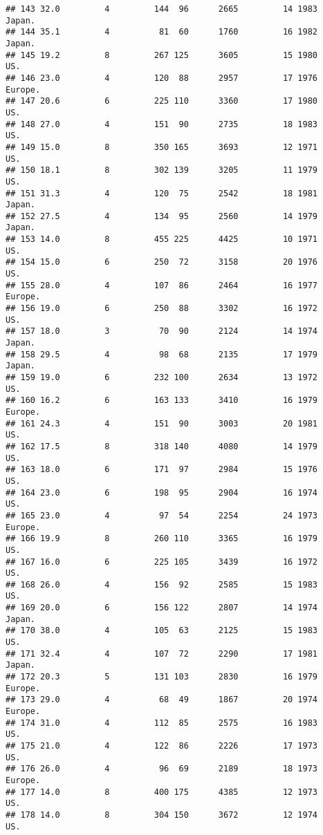 \documentclass[11pt,]{article}
\begin{document}
\begin{verbatim}
## 143 32.0         4         144  96      2665         14 1983   Japan.
## 144 35.1         4          81  60      1760         16 1982   Japan.
## 145 19.2         8         267 125      3605         15 1980      US.
## 146 23.0         4         120  88      2957         17 1976  Europe.
## 147 20.6         6         225 110      3360         17 1980      US.
## 148 27.0         4         151  90      2735         18 1983      US.
## 149 15.0         8         350 165      3693         12 1971      US.
## 150 18.1         8         302 139      3205         11 1979      US.
## 151 31.3         4         120  75      2542         18 1981   Japan.
## 152 27.5         4         134  95      2560         14 1979   Japan.
## 153 14.0         8         455 225      4425         10 1971      US.
## 154 15.0         6         250  72      3158         20 1976      US.
## 155 28.0         4         107  86      2464         16 1977  Europe.
## 156 19.0         6         250  88      3302         16 1972      US.
## 157 18.0         3          70  90      2124         14 1974   Japan.
## 158 29.5         4          98  68      2135         17 1979   Japan.
## 159 19.0         6         232 100      2634         13 1972      US.
## 160 16.2         6         163 133      3410         16 1979  Europe.
## 161 24.3         4         151  90      3003         20 1981      US.
## 162 17.5         8         318 140      4080         14 1979      US.
## 163 18.0         6         171  97      2984         15 1976      US.
## 164 23.0         6         198  95      2904         16 1974      US.
## 165 23.0         4          97  54      2254         24 1973  Europe.
## 166 19.9         8         260 110      3365         16 1979      US.
## 167 16.0         6         225 105      3439         16 1972      US.
## 168 26.0         4         156  92      2585         15 1983      US.
## 169 20.0         6         156 122      2807         14 1974   Japan.
## 170 38.0         4         105  63      2125         15 1983      US.
## 171 32.4         4         107  72      2290         17 1981   Japan.
## 172 20.3         5         131 103      2830         16 1979  Europe.
## 173 29.0         4          68  49      1867         20 1974  Europe.
## 174 31.0         4         112  85      2575         16 1983      US.
## 175 21.0         4         122  86      2226         17 1973      US.
## 176 26.0         4          96  69      2189         18 1973  Europe.
## 177 14.0         8         400 175      4385         12 1973      US.
## 178 14.0         8         304 150      3672         12 1974      US.

\end{verbatim}
\end{document}
